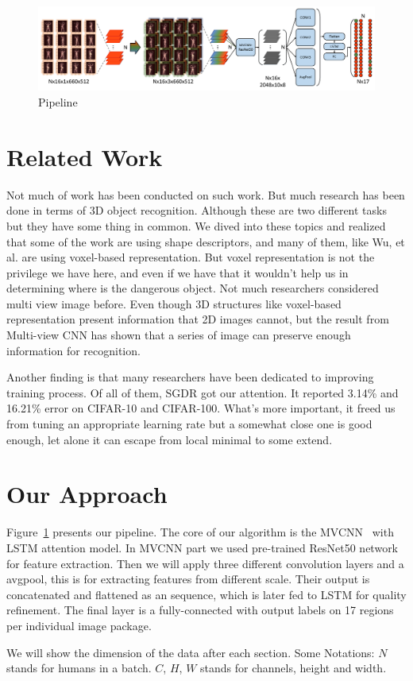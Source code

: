 \documentclass[conference,compsoc]{IEEEtran}
\begin{document}
\begin{figure}[!t]
\includegraphics[width=\textwidth]{../Pic/Network.pdf}
\caption{Pipeline}
\label{network}
\end{figure}
\section{Related Work}
\par Not much of work has been conducted on such work. But much research has been done in terms of 3D object recognition. 
Although these are two different tasks but they have some thing in common. 
We dived into these topics and realized that some of the work are using shape descriptors, and many of them, like Wu, et al. \cite{wu20153d} are using voxel-based representation. But voxel representation is not the privilege we have here, and even if we have that it wouldn't help us in determining where is the dangerous object. 
Not much researchers considered multi view image before. Even though 3D structures like voxel-based representation present information that 2D images cannot, but the result from Multi-view CNN\cite{su15mvcnn}\cite{qi2016volumetric} has shown that a series of image can preserve enough information for recognition. 
\par Another finding is that many researchers have been dedicated to improving training process. Of all of them, SGDR got our attention. It reported 3.14\% and 16.21\% error on CIFAR-10 and CIFAR-100. What's more important, it freed us from tuning an appropriate learning rate but a somewhat close one is good enough, let alone it can escape from local minimal to some extend.


\section{Our Approach}
Figure~\ref{network} presents our pipeline. The core of our algorithm is the MVCNN~\cite{su15mvcnn} with LSTM attention model. In MVCNN part we used pre-trained ResNet50\cite{he2016deep} network for feature extraction. Then we will apply three different convolution layers and a avgpool, this is for extracting features from different scale. Their output is concatenated and flattened as an sequence, which is later fed to LSTM for quality refinement. The final layer is a fully-connected with output labels on 17 regions per individual image package.
\par We will show the dimension of the data after each section. Some Notations: $N$ stands for humans in a batch. $C$, $H$, $W$ stands for channels, height and width.
\end{document}
